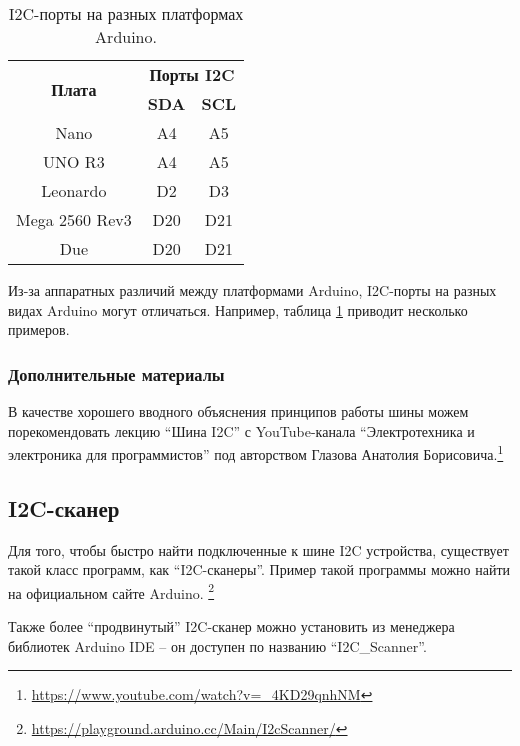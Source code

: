 \documentclass[../sparc.tex]{subfiles}
\begin{document}
\begin{table}[h]
  \centering
  \begin{tabular}{ | c | c | c | }
    \hline
    \multirow{2}{8em}{\textbf{Плата}} & \multicolumn{2}{c|}{\textbf{Порты I2C}} \\
    \cline{2-3}
    & \textbf{SDA} & \textbf{SCL} \\
    \hline
    Nano & A4 & A5 \\
    \hline
    UNO R3 & A4 & A5 \\
    \hline
    Leonardo & D2 & D3 \\
    \hline
    Mega 2560 Rev3 & D20 & D21 \\
    \hline
    Due & D20 & D21 \\
    \hline
  \end{tabular}
  \caption{I2C-порты на разных платформах Arduino.}
  \label{table:i2c-pins}
\end{table}

Из-за аппаратных различий между платформами Arduino, I2C-порты на разных видах
Arduino могут отличаться. Например, таблица \ref{table:i2c-pins} приводит
несколько примеров.

\subsubsection{Дополнительные материалы}

В качестве хорошего вводного объяснения принципов работы шины можем
порекомендовать лекцию ``Шина I2C'' с YouTube-канала ``Электротехника и
электроника для программистов'' под авторством Глазова Анатолия
Борисовича.\footnote{\url{https://www.youtube.com/watch?v=_4KD29qnhNM}}

\subsection{I2C-сканер}
\label{section:i2c-scanner}

Для того, чтобы быстро найти подключенные к шине \gls{I2C} устройства,
существует такой класс программ, как ``I2C-сканеры''.  Пример такой программы
можно найти на официальном сайте
Arduino. \footnote{\url{https://playground.arduino.cc/Main/I2cScanner/}}

Также более ``продвинутый'' I2C-сканер можно установить из менеджера библиотек
Arduino IDE -- он доступен по названию ``I2C\_Scanner''.
\end{document}
